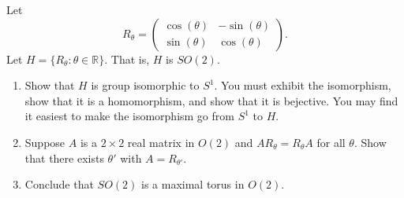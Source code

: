 \documentclass[minion]{homework}
\newcommand{\Reals}{\mathbb{R}}
\begin{document}
\begin{problems}

\problem  Let 
\[
R_\theta = \begin{pmatrix} \cos(\theta) & -\sin(\theta) \\
\sin(\theta) & \cos(\theta) \end{pmatrix}.
\]
Let $H=\{R_\theta:\theta\in\Reals\}$.  That is, $H$ is $SO(2)$.
\begin{enumerate}
  \item Show that $H$ is group isomorphic to $S^1$.  You must exhibit the isomorphism,
  show that it is a homomorphism, and show that it is bejective.  You may find it easiest
  to make the isomorphism go from $S^1$ to $H$.
  \item Suppose $A$ is a $2\times 2$ real matrix in $O(2)$ and $AR_\theta=R_\theta A$
  for all $\theta$.  Show that there exists $\theta'$ with $A=R_{\theta'}$.
  \item Conclude that $SO(2)$ is a maximal torus in $O(2)$.
\end{enumerate}

\end{problems}
\end{document}
